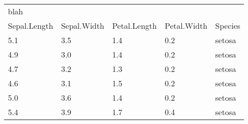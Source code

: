 \begin{tabular}{lllll}
\hline
blah &  &  &  &  \\ \cmidrule(lr){1-2}
Sepal.Length & Sepal.Width & Petal.Length & Petal.Width & Species \\ \hline
5.1 & 3.5 & 1.4 & 0.2 & setosa \\
4.9 & 3.0 & 1.4 & 0.2 & setosa \\
4.7 & 3.2 & 1.3 & 0.2 & setosa \\
4.6 & 3.1 & 1.5 & 0.2 & setosa \\
5.0 & 3.6 & 1.4 & 0.2 & setosa \\
5.4 & 3.9 & 1.7 & 0.4 & setosa \\
\hline
\end{tabular} 
